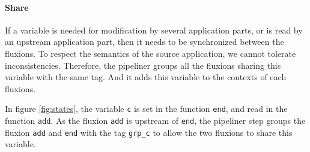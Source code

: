 \paragraph{Share}
If a variable is needed for modification by several application parts, or is read by an upstream application part, then it needs to be synchronized between the fluxions.
To respect the semantics of the source application, we cannot tolerate inconsistencies.
Therefore, the pipeliner groups all the fluxions sharing this variable with the same tag.
And it adds this variable to the contexts of each fluxions.

In figure \ref{fig:states}, the variable \texttt{c} is set in the function \texttt{end}, and read in the function \texttt{add}.
As the fluxion \texttt{add} is upstream of \texttt{end}, the pipeliner step groups the fluxion \texttt{add} and \texttt{end} with the tag \texttt{grp\_c} to allow the two fluxions to share this variable.